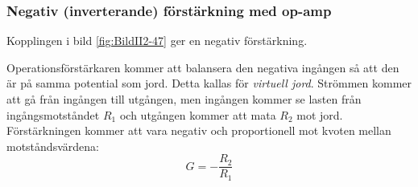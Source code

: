 \subsubsection{Negativ (inverterande) förstärkning med op-amp}
\label{inverterande förstärkning}
\label{virtuell jord}
\label{jordning!virtuell}

Kopplingen i bild \ref{fig:BildII2-47} ger en negativ förstärkning.


Operationsförstärkaren kommer att balansera den negativa ingången så att den
är på samma potential som jord.
Detta kallas för \emph{virtuell jord}.
Strömmen kommer att gå från ingången till utgången, men ingången kommer se
lasten från ingångsmotståndet \(R_1\) och utgången kommer att mata \(R_2\) mot
jord.
Förstärkningen kommer att vara negativ och proportionell mot kvoten mellan
motståndsvärdena:
\[G = -\dfrac{R_2}{R_1}\]
